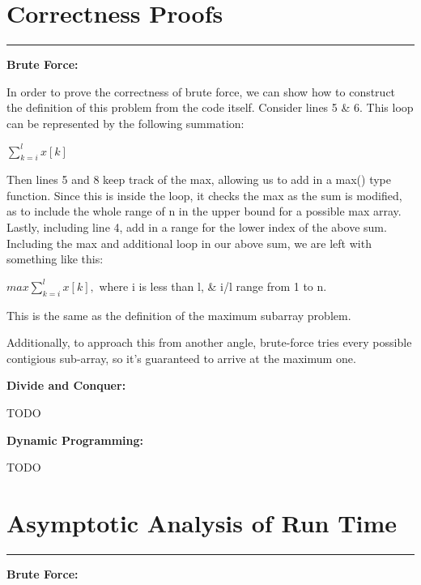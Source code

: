 \documentclass[letterpaper,10pt,titlepage,fleqn]{article}
\begin{document}
\lstset{ numbers=none }

\section*{Correctness Proofs}
\hrule

\begin{centering}
\textbf{Brute Force:}
\end{centering}

In order to prove the correctness of brute force, we can show how to construct the definition of this problem from the code itself. Consider lines 5 \& 6. This loop can be represented by the following summation:

$\sum\limits_{k=i}^{l} x[k]$

Then lines 5 and 8 keep track of the max, allowing us to add in a max() type function. Since this is inside the loop, it checks the max as the sum is modified, as to include the whole range of n in the upper bound for a possible max array. Lastly, including line 4, add in a range for the lower index of the above sum. Including the max and additional loop in our above sum, we are left with something like this:

$max \sum\limits_{k=i}^{l} x[k],$ where i is less than l, \& i/l range from 1 to n.

This is the same as the definition of the maximum subarray problem.

Additionally, to approach this from another angle, brute-force tries every possible contigious sub-array, so it's guaranteed to arrive at the maximum one.

\begin{centering}
\textbf{Divide and Conquer:}
\end{centering}


TODO

\begin{centering}
\textbf{Dynamic Programming:}
\end{centering}


TODO

\section*{Asymptotic Analysis of Run Time}
\hrule

\begin{centering}
\textbf{Brute Force:}
\end{centering}
\end{document}
